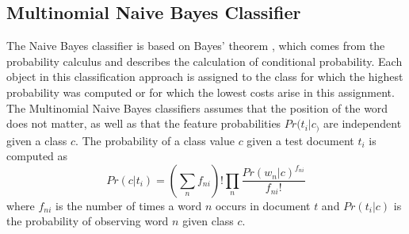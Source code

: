 \documentclass[a4paper, 11pt,titlepage,oneside,openany]{book}
\begin{document}
\subsection{Multinomial Naive Bayes Classifier}
The Naive Bayes classifier is based on  Bayes' theorem \cite{btheory}, which comes from the probability calculus and describes the calculation of conditional probability. Each object in this classification approach is assigned to the class for which the highest probability was computed or for which the lowest costs arise in this assignment.  \\
\noindent The Multinomial Naive Bayes classifiers assumes that the position of the word does not matter, as well as  that the feature probabilities $Pr(t_i|c_)$ are independent given a class $c$.
The probability of a class value $c$ given a test document $t_i$ is computed as \cite{multinomialnb}
\[
Pr(c|t_i)=(\sum_{n}f_{ni})!\prod_{n}\frac{Pr(w_n|c)^{f_{ni}}}{f_{ni}!}
\]
where $f_{ni}$ is the number of times a word $n$ occurs in document $t$ and $Pr(t_i|c)$ is the probability of observing word $n$ given class $c$.
\end{document}
